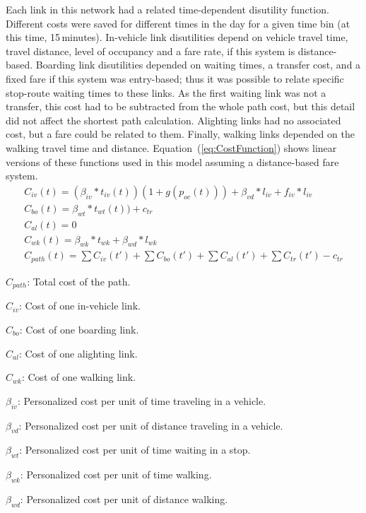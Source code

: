 Each link in this network had a related time-dependent disutility function. Different costs were saved for different times in the day for a given time bin (at this time, 15\,minutes). In-vehicle link disutilities depend on vehicle travel time, travel distance, level of occupancy and a fare rate, if this system is distance-based. Boarding link disutilities depended on waiting times, a transfer cost, and a fixed fare if this system was entry-based; thus it was possible to relate specific stop-route waiting times to these links. As the first waiting link was not a transfer, this cost had to be subtracted from the whole path cost, but this detail did not affect the shortest path calculation. Alighting links had no associated cost, but a fare could be related to them. Finally, walking links depended on the walking travel time and distance. Equation~(\ref{eq:CostFunction}) shows linear versions of these functions used in this model assuming a distance-based fare system.
%
\begin{equation}\label{eq:CostFunction}
	\begin{array}{l}
		C_{iv}(t) = (\beta_{iv}*t_{iv}(t))(1+g(p_{oc}(t))) + \beta_{vd}*l_{iv} + f_{iv}*l_{iv}\\
		C_{bo}(t) = \beta_{wt}*t_{wt}(t)) + c_{tr}\\
		C_{al}(t) = 0\\
		C_{wk}(t) = \beta_{wk}*t_{wk} + \beta_{wd}*l_{wk}\\
		C_{path}(t) = \sum{C_{iv}(t')} + \sum{C_{bo}(t')} + \sum{C_{al}(t')} + \sum{C_{tr}(t')} - c_{tr}
	\end{array}
\end{equation}

$C_{path}$: Total cost of the path.

$C_{iv}$: Cost of one in-vehicle link.

$C_{bo}$: Cost of one boarding link.

$C_{al}$: Cost of one alighting link.

$C_{wk}$: Cost of one walking link.

$\beta_{iv}$: Personalized cost per unit of time traveling in a vehicle.

$\beta_{vd}$: Personalized cost per unit of distance traveling in a vehicle.

$\beta_{wt}$: Personalized cost per unit of time waiting in a stop.

$\beta_{wk}$: Personalized cost per unit of time walking.

$\beta_{wd}$: Personalized cost per unit of distance walking.

